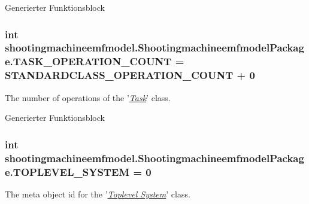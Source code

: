 Generierter Funktionsblock  \hypertarget{interfaceshootingmachineemfmodel_1_1_shootingmachineemfmodel_package_a9b8a8820092643928f0c1ebab194f957}{
\subsubsection[{T\-A\-S\-K\-\_\-\-O\-P\-E\-R\-A\-T\-I\-O\-N\-\_\-\-C\-O\-U\-N\-T}]{\setlength{\rightskip}{0pt plus 5cm}int shootingmachineemfmodel.\-Shootingmachineemfmodel\-Package.\-T\-A\-S\-K\-\_\-\-O\-P\-E\-R\-A\-T\-I\-O\-N\-\_\-\-C\-O\-U\-N\-T = {\bf S\-T\-A\-N\-D\-A\-R\-D\-C\-L\-A\-S\-S\-\_\-\-O\-P\-E\-R\-A\-T\-I\-O\-N\-\_\-\-C\-O\-U\-N\-T} + 0}}\label{interfaceshootingmachineemfmodel_1_1_shootingmachineemfmodel_package_a9b8a8820092643928f0c1ebab194f957}
The number of operations of the '{\itshape \hyperlink{interfaceshootingmachineemfmodel_1_1_task}{Task}}' class.

Generierter Funktionsblock  \hypertarget{interfaceshootingmachineemfmodel_1_1_shootingmachineemfmodel_package_a035b0cce452e9b05e1d638365d50e5ee}{
\subsubsection[{T\-O\-P\-L\-E\-V\-E\-L\-\_\-\-S\-Y\-S\-T\-E\-M}]{\setlength{\rightskip}{0pt plus 5cm}int shootingmachineemfmodel.\-Shootingmachineemfmodel\-Package.\-T\-O\-P\-L\-E\-V\-E\-L\-\_\-\-S\-Y\-S\-T\-E\-M = 0}}\label{interfaceshootingmachineemfmodel_1_1_shootingmachineemfmodel_package_a035b0cce452e9b05e1d638365d50e5ee}
The meta object id for the '\hyperlink{classshootingmachineemfmodel_1_1impl_1_1_toplevel_system_impl}{{\itshape Toplevel System}}' class.

